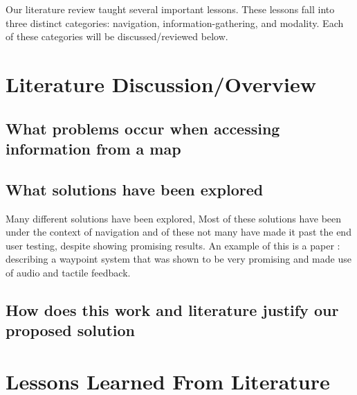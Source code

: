 \documentclass{article}
\begin{document}
Our literature review taught several important lessons. These lessons fall into three distinct categories: navigation, information-gathering, and modality. Each of these categories will be discussed/reviewed below. 

\section{Literature Discussion/Overview}

\subsection{What problems occur when accessing information from a map}


\subsection{What solutions have been explored}
Many different solutions have been explored, Most of these solutions have been under the context of navigation and of these not many have made it past the end user testing, 
despite showing promising results. An example of this is a paper : \cite{} describing a waypoint system that was shown to be very promising and made use of audio and tactile feedback. 



\subsection{How does this work and literature justify our proposed solution}

\section{Lessons Learned From Literature}


\end{document}
